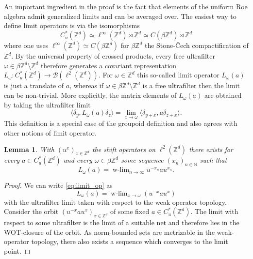 \documentclass[12pt]{amsart}
\newtheorem{lemma}[theorem]{Lemma}
\newcommand{\NM}{{\mathbb N}}
\newcommand{\ZM}{{\mathbb Z}}
\newcommand{\Bb}{{\mathcal B}}
\DeclareMathOperator*{\wlim}{w-lim}
\begin{document}
An important ingredient in the proof is the fact that elements of the uniform Roe algebra admit generalized limits and can be averaged over. 
The easiest way to define limit operators is via the isomorphisms $$C^*_u(\ZM^d)\simeq \ell^\infty(\ZM^d)\rtimes \ZM^d \simeq  C(\beta \ZM^d)\rtimes \ZM^d$$
where one uses $\ell^\infty(\ZM^d)\simeq C(\beta \ZM^d)$ for $\beta\ZM^d$ the Stone-Čech compactification of $\ZM^d$. By the universal property of crossed products, every free ultrafilter $\omega \in \beta\ZM^d\setminus \ZM^d$ therefore generates a covariant representation $L_\omega: C^*_u(\ZM^d)\to \Bb(\ell^2(\ZM^d))$. 
For $\omega\in \ZM^d$ this so-called limit operator $L_\omega(a)$ is just a translate of $a$, whereas if $\omega\in \beta\ZM^d\setminus \ZM^d$ is a free ultrafilter then the limit can be non-trivial. More explicitly, the matrix elements of $L_\omega(a)$ are obtained by taking the ultrafilter limit
\begin{equation}
\label{eq:limit_op}
\langle \delta_y, L_\omega(a)\delta_z\rangle =\lim_{x\to \omega} \langle \delta_{y+x}, a\delta_{z+x}\rangle.
\end{equation}
This definition is a special case of the groupoid definition \cite[Appendix C]{SpakulaWillett2017Metric} and also agrees with other notions of limit operator. 

\begin{lemma}
\label{lemma:weaklimit}
With $(u^x)_{x\in \ZM^d}$ the shift operators on $\ell^2(\ZM^d)$ there exists for every $a \in C^*_u(\ZM^d)$ and every $\omega \in \beta\ZM^d$ some sequence $(x_n)_{n\in \NM}$ such that
$$L_\omega(a) = \wlim_{n\to \infty}u^{-x_n} a u^{x_n}.$$
\end{lemma}
\begin{proof}
We can write \eqref{eq:limit_op} as 
$$L_\omega(a) =\wlim_{x\to \omega} (u^{-x}a u^x)$$
with the ultrafilter limit taken with respect to the weak operator topology. Consider the orbit $(u^{-x} a u^{x})_{x\in \ZM^d}$ of some fixed $a\in C^*_u(\ZM^d)$. The limit with respect to some ultrafilter is the limit of a suitable net and therefore lies in the WOT-closure of the orbit. As norm-bounded sets are metrizable in the weak-operator topology, there also exists a sequence which converges to the limit point.
\end{proof}
\end{document}
